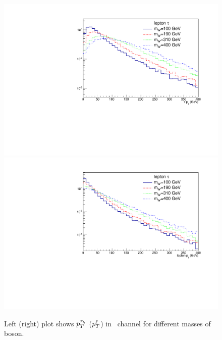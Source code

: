 \begin{figure}[htb]
	\centering
	\includegraphics*[width=.45\textwidth]{figs/Pt_lh_tau.pdf}
	\hspace{3mm}
	\includegraphics*[width=.45\textwidth]{figs/Pt_lh_lep.pdf}
	\caption{Left (right) plot shows $p_T^{\tau_h}$ ($p_T^{\ell}$) in \lepTau ~channel for different masses of \wprime boson.}
	\label{fig:pt-lh}
\end{figure}

